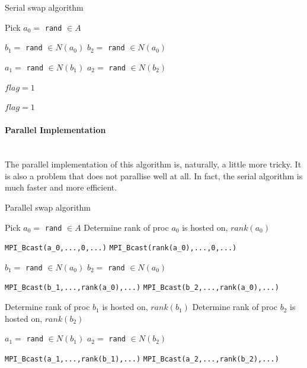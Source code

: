 \documentclass[pdftex,12pt,a4paper]{article}
\begin{document}
\begin{algorithm}
\caption{Serial swap algorithm}
\begin{algorithmic}

\State Pick $a_0 =$ \verb|rand| $\in A$

\State $b_1 =$ \verb|rand| $\in N(a_0)$
\State $b_2 =$ \verb|rand| $\in N(a_0)$
\EndWhile


\State $a_1 =$ \verb|rand| $\in N(b_1)$
\State $a_2 =$ \verb|rand| $\in N(b_2)$
\EndWhile

\State $flag =1$
\EndIf

\State $flag =1$
\EndIf

\EndWhile

\end{algorithmic}
\end{algorithm}


\paragraph{Parallel Implementation} ~\\

The parallel implementation of this algorithm is, naturally, a little more tricky. It is also a problem that does not parallise well at all. In fact, the serial algorithm is much faster and more efficient. 


\begin{algorithm}
\caption{Parallel swap algorithm}
\begin{algorithmic}

\State Pick $a_0 =$ \verb|rand| $\in A$
\State Determine rank of proc $a_0$ is hosted on, $rank(a_0)$
\EndIf

\State \verb|MPI_Bcast(a_0,...,0,...)|
\State \verb|MPI_Bcast(rank(a_0),...,0,...)|

\State $b_1 =$ \verb|rand| $\in N(a_0)$
\State $b_2 =$ \verb|rand| $\in N(a_0)$
\EndWhile
\EndIf

\State \verb|MPI_Bcast(b_1,...,rank(a_0),...)|
\State \verb|MPI_Bcast(b_2,...,rank(a_0),...)|

\State Determine rank of proc $b_1$ is hosted on, $rank(b_1)$
\State Determine rank of proc $b_2$ is hosted on, $rank(b_2)$

\State $a_1 =$ \verb|rand| $\in N(b_1)$
\EndIf
{}
\State $a_2 =$ \verb|rand| $\in N(b_2)$
\EndIf
\EndWhile

\State \verb|MPI_Bcast(a_1,...,rank(b_1),...)|
\State \verb|MPI_Bcast(a_2,...,rank(b_2),...)|

\end{algorithmic}
\end{algorithm}
\end{document}
